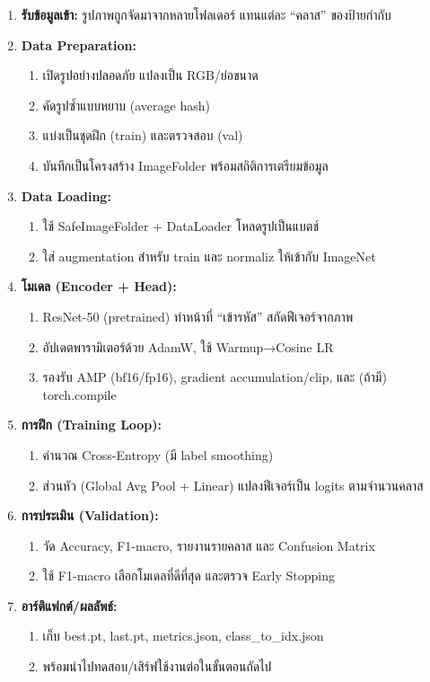 \begin{sloppypar}
	\begin{enumerate} %
		\item \textbf{รับข้อมูลเข้า:} รูปภาพถูกจัดมาจากหลายโฟลเดอร์ แทนแต่ละ “คลาส” ของป้ายกำกับ
		\item \textbf{Data Preparation:}
			\begin{enumerate}
				\item เปิดรูปอย่างปลอดภัย แปลงเป็น RGB/ย่อขนาด
				\item คัดรูปซ้ำแบบหยาบ (average hash)
				\item แบ่งเป็นชุดฝึก (train) และตรวจสอบ (val)
				\item บันทึกเป็นโครงสร้าง ImageFolder พร้อมสถิติการเตรียมข้อมูล
			\end{enumerate}
		\item \textbf{Data Loading:}
			\begin{enumerate}
			\item ใช้ SafeImageFolder + DataLoader โหลดรูปเป็นแบตช์
			\item ใส่ augmentation สำหรับ train และ normaliz ให้เข้ากับ ImageNet
			\end{enumerate}
		\item \textbf{โมเดล (Encoder + Head):}
			\begin{enumerate}
			\item ResNet-50 (pretrained) ทำหน้าที่ “เข้ารหัส” สกัดฟีเจอร์จากภาพ
			\item อัปเดตพารามิเตอร์ด้วย AdamW, ใช้ Warmup→Cosine LR
			\item รองรับ AMP (bf16/fp16), gradient accumulation/clip, และ (ถ้ามี) torch.compile
			\end{enumerate}
		\item \textbf{การฝึก (Training Loop):}
			\begin{enumerate}
			\item คำนวณ Cross-Entropy (มี label smoothing)
			\item ส่วนหัว (Global Avg Pool + Linear) แปลงฟีเจอร์เป็น logits ตามจำนวนคลาส
			\end{enumerate}
		\item \textbf{การประเมิน (Validation):}
			\begin{enumerate}
			\item วัด Accuracy, F1-macro, รายงานรายคลาส และ Confusion Matrix
			\item ใช้ F1-macro เลือกโมเดลที่ดีที่สุด และตรวจ Early Stopping
			\end{enumerate}
		\item \textbf{อาร์ติแฟกต์/ผลลัพธ์:}
					\begin{enumerate}
			\item เก็บ best.pt, last.pt, metrics.json, class\_to\_idx.json
			\item พร้อมนำไปทดสอบ/เสิร์ฟใช้งานต่อในขั้นตอนถัดไป
		\end{enumerate}
	\end{enumerate}
\end{sloppypar}

\clearpage